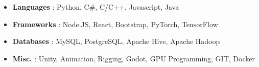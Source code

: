 \begin{cventries}  
\skillentry
    {
        \begin{itemize}
            \item \textbf{Languages} : Python, C\#, C/C++, Javascript, Java
            \item \textbf{Frameworks} : Node.JS, React, Bootstrap, PyTorch, TensorFlow
            \item \textbf{Databases} : MySQL, PostgreSQL, Apache Hive, Apache Hadoop
            \item \textbf{Misc.} : Unity, Animation, Rigging, Godot, GPU Programming, GIT, Docker
        \end{itemize}
    }
    

\end{cventries}
\vspace{0.5 cm}